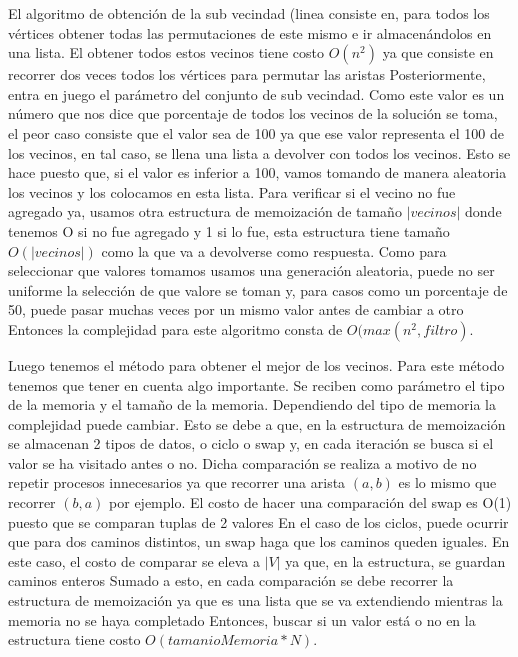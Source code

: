 \documentclass[10pt,a4paper]{article}
\begin{document}
El algoritmo de obtención de la sub vecindad (linea \label{lst:line:tabuvecindad} consiste en, para todos los vértices obtener todas las permutaciones de este mismo e ir almacenándolos en una lista. El obtener todos estos vecinos tiene costo $O(n^2)$ ya que consiste en recorrer dos veces todos los vértices para permutar las aristas
Posteriormente, entra en juego el parámetro del conjunto de sub vecindad. Como este valor es un número que nos dice que porcentaje de todos los vecinos de la solución se toma, el peor caso consiste que el valor sea de 100 ya que ese valor representa el 100 de los vecinos, en tal caso, se llena una lista a devolver con todos los vecinos. Esto se hace puesto que, si el valor es inferior a 100, vamos tomando de manera aleatoria los vecinos y los colocamos en esta lista.
Para verificar si el vecino no fue agregado ya, usamos otra estructura de memoización de tamaño $|vecinos|$ donde tenemos O si no fue agregado y 1 si lo fue, esta estructura tiene tamaño $O(|vecinos|)$ como la que va a devolverse como respuesta.
Como para seleccionar que valores tomamos usamos una generación aleatoria, puede no ser uniforme la selección de que valore se toman y, para casos como un porcentaje de 50, puede pasar muchas veces por un mismo valor antes de cambiar a otro
Entonces la complejidad para este algoritmo consta de $O(max(n^2, filtro)$.

Luego tenemos el método para obtener el mejor de los vecinos. Para este método tenemos que tener en cuenta algo importante. Se reciben como parámetro el tipo de la memoria y el tamaño de la memoria.
Dependiendo del tipo de memoria la complejidad puede cambiar. Esto se debe a que, en la estructura de memoización se almacenan 2 tipos de datos, o ciclo o swap y, en cada iteración se busca si el valor se ha visitado antes o no. Dicha comparación se realiza a motivo de no repetir procesos innecesarios ya que recorrer una arista $(a,b)$ es lo mismo que recorrer $(b,a)$ por ejemplo. El costo de hacer una comparación del swap es O(1) puesto que se comparan tuplas de 2 valores
En el caso de los ciclos, puede ocurrir que para dos caminos distintos, un swap haga que los caminos queden iguales. En este caso, el costo de comparar se eleva a $|V|$ ya que, en la estructura, se guardan caminos enteros
Sumado a esto, en cada comparación se debe recorrer la estructura de memoización ya que es una lista que se va extendiendo mientras la memoria no se haya completado
Entonces, buscar si un valor está o no en la estructura tiene costo $O(tamanioMemoria*N)$.
\end{document}
